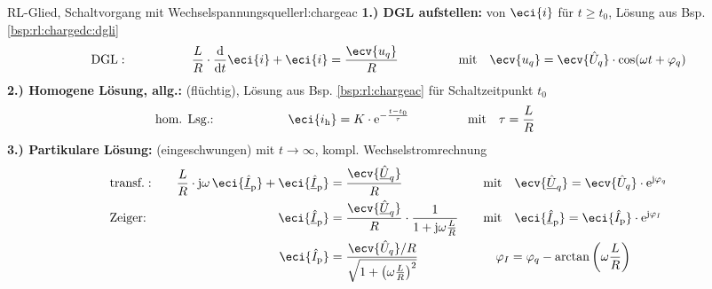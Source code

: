 {\begin{bsp}{RL-Glied, Schaltvorgang mit Wechselspannungsquelle}{rl:chargeac}
        \textbf{1.) DGL aufstellen:} von $\eci{i}$ für $t \geq t_0$, Lösung aus Bsp. \ref{bsp:rl:chargedc:dgli}
        \begin{align*}
            &\text{DGL}:&&&
                \frac{L}{R} \cdot \frac{\mathrm{d}}{\mathrm{d}t} \eci{i}  + \eci{i}   &= \frac{\ecv{u_q}}{R}&&&
                &\text{mit}\quad \ecv{u_q} = \ecv{\hat{U}_q} \cdot \cos(\omega t + \varphi_q)
            \\[-15pt]&\hphantom{R1oooooooooo}&&&\hphantom{L3ooooooooooo}&\hphantom{R3ooooooooooooooo}&&&&\hphantom{R5ooooooooooooooooooooooo}\nonumber%
        \end{align*}%
        \textbf{2.) Homogene Lösung, allg.:} (flüchtig), Lösung aus Bsp. \ref{bsp:rl:chargeac} für Schaltzeitpunkt $t_0$
        \begin{align*}
            &\text{hom. Lsg.:} &&&
                \eci{i_{\mathrm{h}}}&= K \cdot \mathrm{e}^{-\frac{t-t_0}{\tau}} &&&
                &\text{mit}\quad \tau = \frac{L}{R}
            \\[-15pt]&\hphantom{R1oooooooooo}&&&\hphantom{L3ooooooooooo}&\hphantom{R3ooooooooooooooo}&&&&\hphantom{R5ooooooooooooooooooooooo}\nonumber%
        \end{align*}%
        \textbf{3.) Partikulare Lösung:} (eingeschwungen) mit $t \to \infty$, kompl. Wechselstromrechnung%
        \begin{align*}%
                &\text{transf.}:&&&
                \frac{L}{R} \cdot \mathrm{j}\omega\, \eci{\underline{\hat{I}}_{\mathrm p}} + \eci{\underline{\hat{I}}_{\mathrm p}} &= \frac{\ecv{\underline{\hat{U}}_q}}{R} &&&
                    &\text{mit}\quad \ecv{\underline{\hat{U}}_q}=\ecv{\hat{U}_q} \cdot \mathrm{e}^{\mathrm{j}\varphi_q}\\
                &\text{Zeiger:}&&&
                    \eci{\underline{\hat{I}}_{\mathrm p}} &= \frac{\ecv{\underline{\hat{U}}_q}}{R} \cdot \frac{1}{1 + \mathrm{j} \omega \frac{L}{R}} &&&
                    &\text{mit}\quad \eci{\underline{\hat{I}}_{\mathrm p}} = \eci{\hat{I}_{\mathrm p}}\cdot\mathrm{e}^{\mathrm{j}\varphi_I}\\
                &&&&
                    \eci{\hat{I}_{\mathrm p}} &=  \frac{\ecv{\hat{U}_q}/R}{\sqrt{1 + \left(\omega \frac{L}{R}\right)^2}} &&&
                    &\quad \varphi_I = \varphi_q - \arctan\left(\omega \frac{L}{R}\right) \\

\end{align*}
\end{bsp}}
